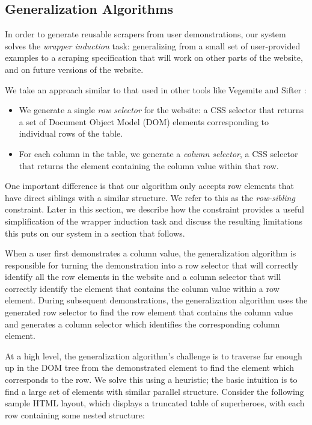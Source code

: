 \documentclass[sigconf,10pt]{acmart}
\providecommand{\tightlist}{%
  \setlength{\itemsep}{0pt}\setlength{\parskip}{0pt}}
\begin{document}
\hypertarget{generalization-algorithms}{%
\subsection{Generalization Algorithms}\label{generalization-algorithms}}

In order to generate reusable scrapers from user demonstrations, our
system solves the \emph{wrapper induction} \citep{kushmerick2000} task:
generalizing from a small set of user-provided examples to a scraping
specification that will work on other parts of the website, and on
future versions of the website.

We take an approach similar to that used in other tools like Vegemite
\citep{lin2009} and Sifter \citep{huynh2006}:

\begin{itemize}
\tightlist
\item
  We generate a single \emph{row selector} for the website: a CSS
  selector that returns a set of Document Object Model (DOM) elements
  corresponding to individual rows of the table.
\item
  For each column in the table, we generate a \emph{column selector}, a
  CSS selector that returns the element containing the column value
  within that row.
\end{itemize}

One important difference is that our algorithm only accepts row elements
that have direct siblings with a similar structure. We refer to this as
the \emph{row-sibling} constraint. Later in this section, we describe
how the constraint provides a useful simplification of the wrapper
induction task and discuss the resulting limitations this puts on our
system in a section that follows.

When a user first demonstrates a column value, the generalization
algorithm is responsible for turning the demonstration into a row
selector that will correctly identify all the row elements in the
website and a column selector that will correctly identify the element
that contains the column value within a row element. During subsequent
demonstrations, the generalization algorithm uses the generated row
selector to find the row element that contains the column value and
generates a column selector which identifies the corresponding column
element.

At a high level, the generalization algorithm's challenge is to traverse
far enough up in the DOM tree from the demonstrated element to find the
element which corresponds to the row. We solve this using a heuristic;
the basic intuition is to find a large set of elements with similar
parallel structure. Consider the following sample HTML layout, which
displays a truncated table of superheroes, with each row containing some
nested structure:
\end{document}
